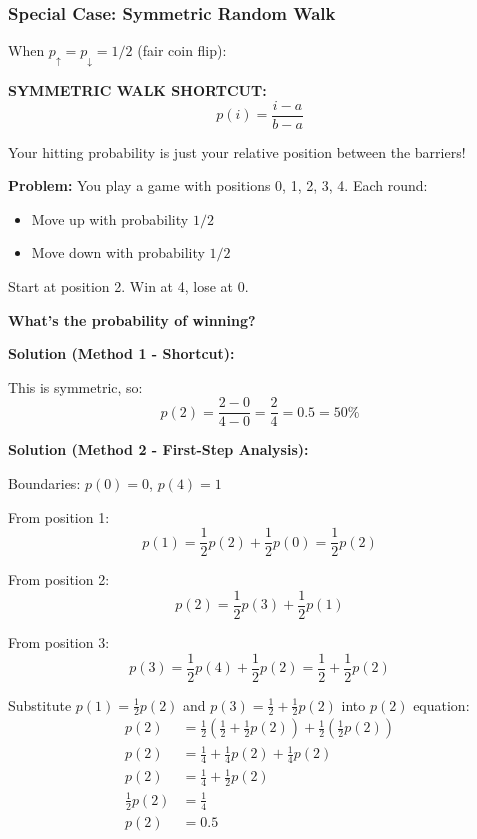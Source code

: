\documentclass[10pt,letterpaper]{article}
\begin{document}
\subsubsection{Special Case: Symmetric Random Walk}

When $p_{\uparrow} = p_{\downarrow} = 1/2$ (fair coin flip):

\begin{formulabox}
\textbf{SYMMETRIC WALK SHORTCUT:}
\[
\boxed{p(i) = \frac{i - a}{b - a}}
\]

Your hitting probability is just your relative position between the barriers!
\end{formulabox}

\begin{examplebox}
\textbf{Problem:} You play a game with positions 0, 1, 2, 3, 4. Each round:
\begin{itemize}
  \item Move up with probability $1/2$
  \item Move down with probability $1/2$
\end{itemize}

Start at position 2. Win at 4, lose at 0.

\textbf{What's the probability of winning?}

\textbf{Solution (Method 1 - Shortcut):}

This is symmetric, so:
\[
p(2) = \frac{2 - 0}{4 - 0} = \frac{2}{4} = \boxed{0.5 = 50\%}
\]

\textbf{Solution (Method 2 - First-Step Analysis):}

Boundaries: $p(0) = 0$, $p(4) = 1$

From position 1:
\[
p(1) = \frac{1}{2} p(2) + \frac{1}{2} p(0) = \frac{1}{2} p(2)
\]

From position 2:
\[
p(2) = \frac{1}{2} p(3) + \frac{1}{2} p(1)
\]

From position 3:
\[
p(3) = \frac{1}{2} p(4) + \frac{1}{2} p(2) = \frac{1}{2} + \frac{1}{2} p(2)
\]

Substitute $p(1) = \frac{1}{2}p(2)$ and $p(3) = \frac{1}{2} + \frac{1}{2}p(2)$ into $p(2)$ equation:
\begin{align*}
p(2) &= \frac{1}{2}\left(\frac{1}{2} + \frac{1}{2}p(2)\right) + \frac{1}{2}\left(\frac{1}{2}p(2)\right) \\
p(2) &= \frac{1}{4} + \frac{1}{4}p(2) + \frac{1}{4}p(2) \\
p(2) &= \frac{1}{4} + \frac{1}{2}p(2) \\
\frac{1}{2}p(2) &= \frac{1}{4} \\
p(2) &= \boxed{0.5}
\end{align*}
\end{examplebox}
\end{document}
